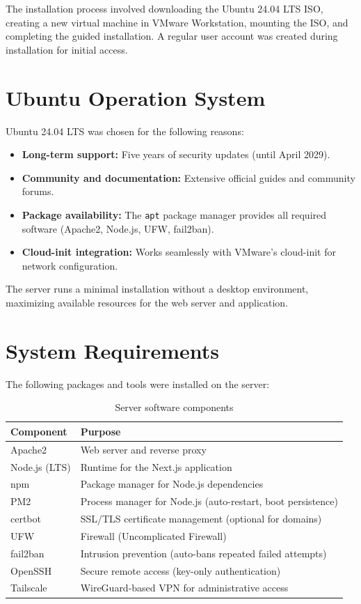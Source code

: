 \documentclass[12pt,a4paper]{report}
\begin{document}
The installation process involved downloading the Ubuntu 24.04 LTS ISO, creating a new virtual machine in VMware Workstation, mounting the ISO, and completing the guided installation. A regular user account was created during installation for initial access.

\section{Ubuntu Operation System}

\indent Ubuntu 24.04 LTS was chosen for the following reasons:

\begin{itemize}[leftmargin=2em]
    \item \textbf{Long-term support:} Five years of security updates (until April 2029).
    \item \textbf{Community and documentation:} Extensive official guides and community forums.
    \item \textbf{Package availability:} The \texttt{apt} package manager provides all required software (Apache2, Node.js, UFW, fail2ban).
    \item \textbf{Cloud-init integration:} Works seamlessly with VMware's cloud-init for network configuration.
\end{itemize}

The server runs a minimal installation without a desktop environment, maximizing available resources for the web server and application.
\newpage

\section{System Requirements}

\indent The following packages and tools were installed on the server:

\begin{table}[H]
\centering
\small
\begin{tabularx}{\textwidth}{l X}
\toprule
\textbf{Component} & \textbf{Purpose} \\
\midrule
Apache2      & Web server and reverse proxy \\
Node.js (LTS) & Runtime for the Next.js application \\
npm          & Package manager for Node.js dependencies \\
PM2          & Process manager for Node.js (auto-restart, boot persistence) \\
certbot      & SSL/TLS certificate management (optional for domains) \\
UFW          & Firewall (Uncomplicated Firewall) \\
fail2ban     & Intrusion prevention (auto-bans repeated failed attempts) \\
OpenSSH      & Secure remote access (key-only authentication) \\
Tailscale    & WireGuard-based VPN for administrative access \\
\bottomrule
\end{tabularx}
\caption{Server software components}
\end{table}
\end{document}
